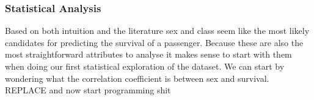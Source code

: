 \documentclass[english, a4paper]{article}
\begin{document}
\subsubsection{Statistical Analysis}
Based on both intuition and the literature sex and class seem like the most likely candidates for predicting the survival of a passenger. Because these are also the most straightforward attributes to analyse it makes sense to start with them when doing our first statistical exploration of the dataset. We can start by wondering what the correlation coefficient is between sex and survival. REPLACE and now start programming shit


\end{document}
